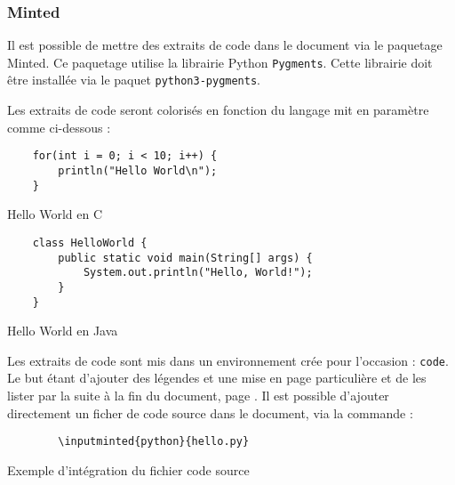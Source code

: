 \subsubsection{Minted}
Il est possible de mettre des extraits de code dans le document via le paquetage Minted.
Ce paquetage utilise la librairie Python \verb=Pygments=.
Cette librairie doit être installée via le paquet \verb=python3-pygments=.

Les extraits de code seront colorisés en fonction du langage mit en paramètre comme ci-dessous :

\begin{code}
    \begin{verbatim}
    for(int i = 0; i < 10; i++) {
        println("Hello World\n");
    }
\end{verbatim}
    \caption{Hello World en C}
\end{code}

\begin{code}
    \begin{verbatim}
    class HelloWorld {
        public static void main(String[] args) {
            System.out.println("Hello, World!");
        }
    }
\end{verbatim}
    \caption{Hello World en Java}
\end{code}

Les extraits de code sont mis dans un environnement crée pour l'occasion : \verb=code=.
Le but étant d'ajouter des légendes et une mise en page particulière et de les lister par la suite à la fin du document,
page \pageref{TableOfCode}.
Il est possible d'ajouter directement un ficher de code source dans le document, via la commande :
\begin{code}
    \begin{verbatim}
        \inputminted{python}{hello.py}
\end{verbatim}
    \caption{Exemple d'intégration du fichier code source}
\end{code}

